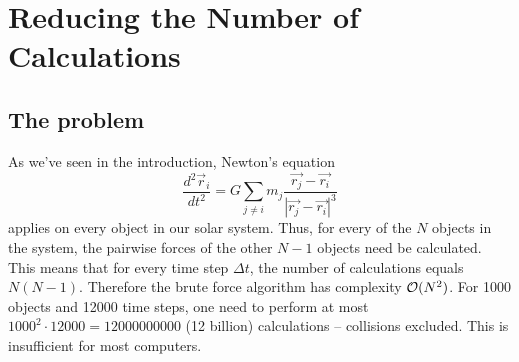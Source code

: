 \section{Reducing the Number of Calculations}
\subsection{The problem}
As we've seen in the introduction, Newton's equation
\begin{equation}
\frac{d^2\vec{r}_i}{dt^2}=G\sum_{j\neq i}m_j\frac{\vec{r_j}-\vec{r_i}}{|\vec{r_j}-\vec{r_i}|^3}
\label{Newton G}
\end{equation}
applies on every object in our solar system. Thus, for every of the $N$ objects in the system, the pairwise forces of the other $N-1$ objects need be calculated. This means that for every time step $\Delta t$, the number of calculations equals $N(N-1)$. Therefore the brute force algorithm has complexity $\mathcal{O}(N^2)$. For 1000 objects and 12000 time steps, one need to perform at most $1000^2\cdot 12000 = 12000000000$ (12 billion) calculations -- collisions excluded. This is insufficient for most computers.
